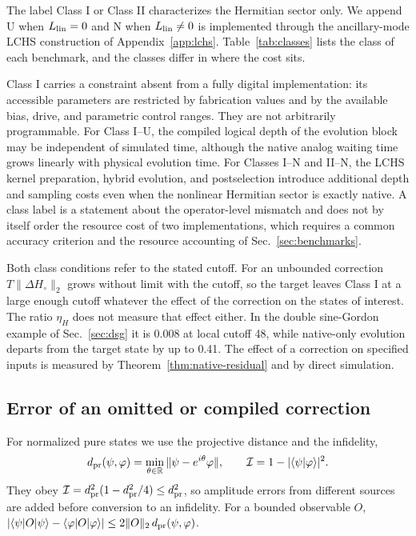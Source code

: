 \documentclass[pra,twocolumn,superscriptaddress,nofootinbib,floatfix]{revtex4-2}
\theoremstyle{remark}
\newcommand{\dpr}{d_{\rm pr}}
\begin{document}
The label Class I or Class II characterizes the Hermitian sector only. We append U when $L_{\rm lin}=0$ and N when $L_{\rm lin}\neq0$ is implemented through the ancillary-mode LCHS construction of Appendix~\ref{app:lchs}. Table~\ref{tab:classes} lists the class of each benchmark, and the classes differ in where the cost sits.

Class I carries a constraint absent from a fully digital implementation: its accessible parameters are restricted by fabrication values and by the available bias, drive, and parametric control ranges. They are not arbitrarily programmable. For Class I--U, the compiled logical depth of the evolution block may be independent of simulated time, although the native analog waiting time grows linearly with physical evolution time. For Classes I--N and II--N, the LCHS kernel preparation, hybrid evolution, and postselection introduce additional depth and sampling costs even when the nonlinear Hermitian sector is exactly native. A class label is a statement about the operator-level mismatch and does not by itself order the resource cost of two implementations, which requires a common accuracy criterion and the resource accounting of Sec.~\ref{sec:benchmarks}.

Both class conditions refer to the stated cutoff. For an unbounded correction \(T\|\Delta H_\circ\|_2\) grows without limit with the cutoff, so the target leaves Class I at a large enough cutoff whatever the effect of the correction on the states of interest. The ratio \(\eta_H\) does not measure that effect either. In the double sine-Gordon example of Sec.~\ref{sec:dsg} it is 0.008 at local cutoff 48, while native-only evolution departs from the target state by up to 0.41. The effect of a correction on specified inputs is measured by Theorem~\ref{thm:native-residual} and by direct simulation.

\subsection{Error of an omitted or compiled correction}
\label{subsec:error-bounds}

For normalized pure states we use the projective distance and the infidelity,
\begin{align}
\dpr(\psi,\varphi)=\min_{\theta\in\mathbb R}\|\psi-e^{i\theta}\varphi\|,\qquad \mathcal I=1-|\langle\psi|\varphi\rangle|^2 .
\label{eq:metrics}
\end{align}
They obey \(\mathcal I=\dpr^2(1-\dpr^2/4)\le\dpr^2\), so amplitude errors from different sources are added before conversion to an infidelity. For a bounded observable \(O\), \(|\langle\psi|O|\psi\rangle-\langle\varphi|O|\varphi\rangle|\le2\|O\|_2\,\dpr(\psi,\varphi)\).
\end{document}

